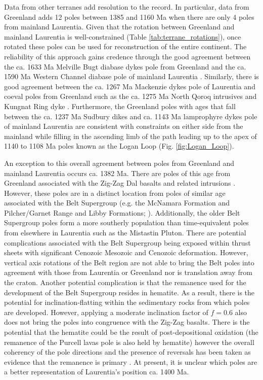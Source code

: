 \documentclass[11pt,letterpaper]{article}
\begin{document}
Data from other terranes add resolution to the record. In particular, data from Greenland adds 12 poles between 1385 and 1160 Ma when there are only 4 poles from mainland Laurentia. Given that the rotation between Greenland and mainland Laurentia is well-constrained (Table \ref{tab:terrane_rotations}), once rotated these poles can be used for reconstruction of the entire continent. The reliability of this approach gains credence through the good agreement between the ca. 1633 Ma Melville Bugt diabase dykes pole from Greenland \citep{Halls2011a} and the ca. 1590 Ma Western Channel diabase pole of mainland Laurentia \citep{Irving1972a}. Similarly, there is good agreement between the ca. 1267 Ma Mackenzie dykes pole of Laurentia \citep{Buchan2000a} and coeval poles from Greenland such as the ca. 1275 Ma North Qoroq intrusives \citep{Piper1992a} and Kungnat Ring dyke \citep{Piper1977a}. Furthermore, the Greenland poles with ages that fall between the ca. 1237 Ma Sudbury dikes and ca. 1143 Ma lamprophyre dykes pole of mainland Laurentia are consistent with constraints on either side from the mainland while filling in the ascending limb of the path leading up to the apex of 1140 to 1108 Ma poles known as the Logan Loop (Fig. \ref{fig:Logan_Loop}).

An exception to this overall agreement between poles from Greenland and mainland Laurentia occurs ca. 1382 Ma. There are poles of this age from Greenland associated with the Zig-Zag Dal basalts and related intrusions \citep{Marcussen1983a, Abrahamsen1987a}. However, these poles are in a distinct location from poles of similar age associated with the Belt Supergroup (e.g. the McNamara Formation and Pilcher/Garnet Range and Libby Formations; \citealp{Elston2002a}). Additionally, the older Belt Supergroup poles form a more southerly population than time-equivalent poles from elsewhere in Laurentia such as the Mistastin Pluton. There are potential complications associated with the Belt Supergroup being exposed within thrust sheets with significant Cenozoic Mesozoic and Cenozoic deformation. However, vertical axis rotations of the Belt region are not able to bring the Belt poles into agreement with those from Laurentia or Greenland nor is translation away from the craton. Another potential complication is that the remanence used for the development of the Belt Supergroup resides in hematite. As a result, there is the potential for inclination-flatting within the sedimentary rocks from which poles are developed. However, applying a moderate inclination factor of $f=0.6$ also does not bring the poles into congruence with the Zig-Zag basalts.  There is the potential that the hematite could be the result of post-depositional oxidation (the remanence of the Purcell lavas pole is also held by hematite) however the overall coherency of the pole directions and the presence of reversals has been taken as evidence that the remanence is primary \citep{Elston2002a}. At present, it is unclear which poles are a better representation of Laurentia's position ca. 1400 Ma.
\end{document}
